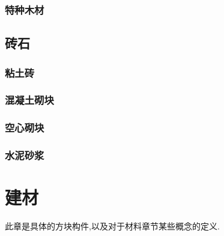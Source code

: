 {{{      }

      \subsubsection{特种木材}{

      }
  }

  \subsection{砖石}{

      \subsubsection{粘土砖}{

      }

      \subsubsection{混凝土砌块}{

      }

      \subsubsection{空心砌块}{

      }

      \subsubsection{水泥砂浆}{

      }

  }
 }

\section{建材}{
  此章是具体的方块构件,以及对于材料章节某些概念的定义.
 }